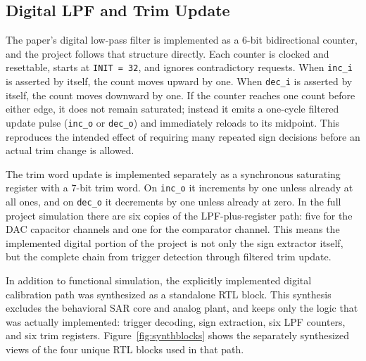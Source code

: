 \documentclass[11pt]{article}
\begin{document}
\subsection{Digital LPF and Trim Update}
The paper's \cite{ding2017} digital low-pass filter is implemented as a 6-bit bidirectional counter, and the project follows that structure directly. Each counter is clocked and resettable, starts at \texttt{INIT = 32}, and ignores contradictory requests. When \texttt{inc\_i} is asserted by itself, the count moves upward by one. When \texttt{dec\_i} is asserted by itself, the count moves downward by one. If the counter reaches one count before either edge, it does not remain saturated; instead it emits a one-cycle filtered update pulse (\texttt{inc\_o} or \texttt{dec\_o}) and immediately reloads to its midpoint. This reproduces the intended effect of requiring many repeated sign decisions before an actual trim change is allowed.

The trim word update is implemented separately as a synchronous saturating register with a 7-bit trim word. On \texttt{inc\_o} it increments by one unless already at all ones, and on \texttt{dec\_o} it decrements by one unless already at zero. In the full project simulation there are six copies of the LPF-plus-register path: five for the DAC capacitor channels and one for the comparator channel. This means the implemented digital portion of the project is not only the sign extractor itself, but the complete chain from trigger detection through filtered trim update.

In addition to functional simulation, the explicitly implemented digital calibration path was synthesized as a standalone RTL block. This synthesis excludes the behavioral SAR core and analog plant, and keeps only the logic that was actually implemented: trigger decoding, sign extraction, six LPF counters, and six trim registers. Figure~\ref{fig:synthblocks} shows the separately synthesized views of the four unique RTL blocks used in that path.
\end{document}

